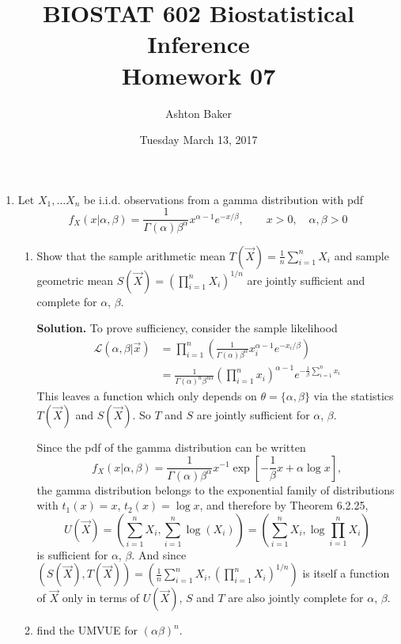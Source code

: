 \documentclass[titlepage]{article}
\begin{document}
\title{BIOSTAT 602 Biostatistical Inference\\Homework 07}
\author{Ashton Baker}
\date{Tuesday March 13, 2017}
\maketitle
\begin{enumerate}
\item Let $X_1, \ldots X_n$ be i.i.d. observations from a gamma distribution with pdf
  \[f_X(x | \alpha, \beta) = \frac{1}{\Gamma(\alpha)\beta^\alpha}x^{\alpha-1}e^{-x/\beta}, \qquad x > 0, \quad \alpha, \beta > 0\]
  \begin{enumerate}
  \item Show that the sample arithmetic mean $T(\vec{X}) = \frac{1}{n}\sum_{i=1}^n X_i$ and sample geometric mean $S(\vec{X}) = (\prod_{i=1}^n X_i)^{1/n}$ are jointly sufficient and complete for $\alpha$, $\beta$.


  \textbf{Solution.} To prove sufficiency, consider the sample likelihood
  \[\begin{aligned}
  \mathcal{L}(\alpha, \beta | \vec{x}) &= \prod_{i=1}^n\left(\frac{1}{\Gamma(\alpha)\beta^\alpha}x_i^{\alpha-1}e^{-x_i/\beta}\right) \\
  &= \frac{1}{\Gamma(\alpha)^n\beta^{n\alpha}}\left(\prod_{i=1}^nx_i\right)^{\alpha-1}e^{-\frac{1}{\beta}\sum_{i=1}^nx_i}
  \end{aligned}\]
  This leaves a function which only depends on $\theta = \{\alpha, \beta\}$ via the statistics $T(\vec{X})$ and $S(\vec{X})$. So $T$ and $S$ are jointly sufficient for $\alpha$, $\beta$.

  Since the pdf of the gamma distribution can be written
    \[f_X(x|\alpha, \beta) = \frac{1}{\Gamma(\alpha)\beta^\alpha}x^{-1}\exp\left[-\frac{1}{\beta}x + \alpha \log x\right],\]
  the gamma distribution belongs to the exponential family of distributions with $t_1(x) = x$, $t_2(x) = \log x$, and therefore by Theorem 6.2.25,
    \[U(\vec{X}) = \left(\sum_{i=1}^n X_i, \sum_{i=1}^n \log(X_i)\right) = \left(\sum_{i=1}^n X_i, \log\prod_{i=1}^n X_i\right)\]
  is sufficient for $\alpha$, $\beta$. And since $(S(\vec{X}), T(\vec{X})) = \left(\frac{1}{n}\sum_{i=1}^n X_i, (\prod_{i=1}^n X_i)^{1/n} \right)$ is itself a function of $\vec{X}$ only in terms of $U(\vec{X})$, $S$ and $T$ are also jointly complete for $\alpha$, $\beta$.

  \item find the UMVUE for $(\alpha\beta)^n$.


\end{enumerate}
\end{enumerate}
\end{document}
